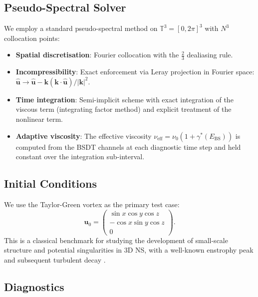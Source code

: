 \documentclass[12pt, a4paper]{article}
\newcommand{\T}{\mathbb{T}}
\newcommand{\Ebs}{E_{\mathrm{BS}}}
\newcommand{\gammastar}{\gamma^*}
\begin{document}
\subsection{Pseudo-Spectral Solver}

We employ a standard pseudo-spectral method on $\T^3 = [0, 2\pi]^3$
with $N^3$ collocation points:

\begin{itemize}
\item \textbf{Spatial discretisation}: Fourier collocation with the
  $\frac{2}{3}$ dealiasing rule.
\item \textbf{Incompressibility}: Exact enforcement via Leray projection
  in Fourier space: $\hat{\mathbf{u}} \to \hat{\mathbf{u}} -
  \mathbf{k}(\mathbf{k} \cdot \hat{\mathbf{u}})/|\mathbf{k}|^2$.
\item \textbf{Time integration}: Semi-implicit scheme with exact
  integration of the viscous term (integrating factor method) and
  explicit treatment of the nonlinear term.
\item \textbf{Adaptive viscosity}: The effective viscosity
  $\nu_{\mathrm{eff}} = \nu_0(1 + \gammastar(\Ebs))$ is computed
  from the BSDT channels at each diagnostic time step and held
  constant over the integration sub-interval.
\end{itemize}

\subsection{Initial Conditions}

We use the Taylor-Green vortex \cite{taylor1937} as the primary
test case:
\begin{equation}
\mathbf{u}_0 = \begin{pmatrix}
\sin x \cos y \cos z \\
-\cos x \sin y \cos z \\
0
\end{pmatrix}.
\end{equation}
This is a classical benchmark for studying the development
of small-scale structure and potential singularities in 3D NS,
with a well-known enstrophy peak and subsequent turbulent decay
\cite{brachet1983}.

\subsection{Diagnostics}
\end{document}
